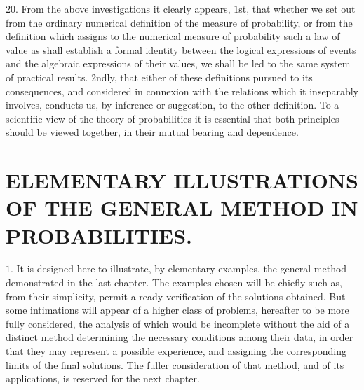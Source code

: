 \documentclass[oneside]{book}
\begin{document}
$20$. From the above investigations it clearly appears, $1$st,
that whether we set out from the ordinary numerical definition
of the measure of probability, or from the definition which assigns
to the numerical measure of probability such a law of value as
shall establish a formal identity between the logical expressions
of events and the algebraic expressions of their values, we shall
be led to the same system of practical results. $2$ndly, that
either of these definitions pursued to its consequences, and considered
in connexion with the relations which it inseparably involves,
conducts us, by inference or suggestion, to the other
definition. To a scientific view of the theory of probabilities
it is essential that both principles should be viewed together, in
their mutual bearing and dependence.

\chapter[ELEMENTARY ILLUSTRATIONS]{\large ELEMENTARY ILLUSTRATIONS OF THE GENERAL METHOD IN PROBABILITIES.}

$1$. It is designed here to illustrate, by elementary examples,
the general method demonstrated in the last chapter.
The examples chosen will be chiefly such as, from their simplicity,
permit a ready verification of the solutions obtained.
But some intimations will appear of a higher class of problems,
hereafter to be more fully considered, the analysis of which
would be incomplete without the aid of a distinct method determining
the necessary conditions among their data, in order that
they may represent a possible experience, and assigning the corresponding
limits of the final solutions. The fuller consideration
of that method, and of its applications, is reserved for the next
chapter.
\end{document}
